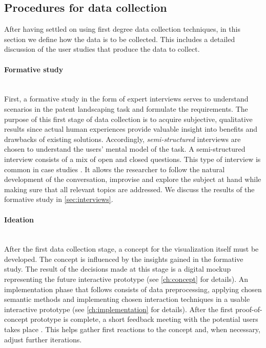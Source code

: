 \subsection{Procedures for data collection}
\label{subsec:procedures_for_data_collection}

After having settled on using first degree data collection techniques, in this section we define how the data is to be collected.
This includes a detailed discussion of the user studies that produce the data to collect.

\paragraph{Formative study}~\\
First, a formative study in the form of expert interviews serves to understand scenarios in the patent landscaping task and formulate the requirements. 
The purpose of this first stage of data collection is to acquire subjective, qualitative results since actual human experiences provide valuable insight into benefits and drawbacks of existing solutions. 
Accordingly, \textit{semi-structured} interviews are chosen to understand the users’ mental model of the task.
A semi-structured interview consists of a mix of open and closed questions.
This type of interview is common in case studies \cite{Runeson2009}.
It allows the researcher to follow the natural development of the conversation, improvise and explore the subject at hand while making sure that all relevant topics are addressed.
We discuss the results of the formative study in \autoref{sec:interviews}. 

\paragraph{Ideation}~\\
After the first data collection stage, a concept for the visualization itself must be developed. 
The concept is influenced by the insights gained in the formative study. 
The result of the decisions made at this stage is a digital mockup representing the future interactive prototype (see \autoref{ch:concept} for details).
An implementation phase that follows consists of data preprocessing, applying chosen semantic methods and implementing chosen interaction techniques in a usable interactive prototype (see \autoref{ch:implementation} for details).
After the first proof-of-concept prototype is complete, a short feedback meeting with the potential users takes place .
This helps gather first reactions to the concept and, when necessary, adjust further iterations.

